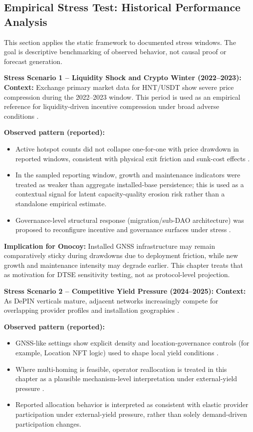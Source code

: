 \subsection{Empirical Stress Test: Historical Performance Analysis}
This section applies the static framework to documented stress windows. The goal is descriptive benchmarking of observed behavior, not causal proof or forecast generation.

\noindent\textbf{Stress Scenario 1 -- Liquidity Shock and Crypto Winter (2022--2023):}
\noindent\textbf{Context:}
Exchange primary market data for HNT/USDT show severe price compression during the 2022--2023 window. This period is used as an empirical reference for liquidity-driven incentive compression under broad adverse conditions \cite{BinanceHNTUSDTWeekly2022_2023,Ho2022}.

\noindent\textbf{Observed pattern (reported):}
\begin{itemize}
    \item Active hotspot counts did not collapse one-for-one with price drawdown in reported windows, consistent with physical exit friction and sunk-cost effects \cite{Ballandies2023}.
    \item In the sampled reporting window, growth and maintenance indicators were treated as weaker than aggregate installed-base persistence; this is used as a contextual signal for latent capacity-quality erosion risk rather than a standalone empirical estimate.
    \item Governance-level structural response (migration/sub-DAO architecture) was proposed to reconfigure incentive and governance surfaces under stress \cite{HeliumHIP70}.
\end{itemize}

\noindent\textbf{Implication for Onocoy:}
Installed GNSS infrastructure may remain comparatively sticky during drawdowns due to deployment friction, while new growth and maintenance intensity may degrade earlier. This chapter treats that as motivation for DTSE sensitivity testing, not as protocol-level projection.

\noindent\textbf{Stress Scenario 2 -- Competitive Yield Pressure (2024--2025):}
\noindent\textbf{Context:}
As DePIN verticals mature, adjacent networks increasingly compete for overlapping provider profiles and installation geographies \cite{Lin2024, Chiu2024}.

\noindent\textbf{Observed pattern (reported):}
\begin{itemize}
    \item GNSS-like settings show explicit density and location-governance controls (for example, Location NFT logic) used to shape local yield conditions \cite{GeodnetLocationNFT}.
    \item Where multi-homing is feasible, operator reallocation is treated in this chapter as a plausible mechanism-level interpretation under external-yield pressure \cite{Lin2024, Chiu2024}.
    \item Reported allocation behavior is interpreted as consistent with elastic provider participation under external-yield pressure, rather than solely demand-driven participation changes.
\end{itemize}

